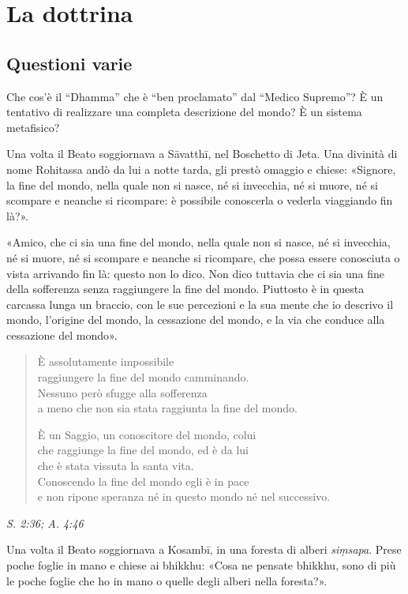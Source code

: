 \chapter{La dottrina}

\hypertarget{x-questioni-varie}{\section*{Questioni varie}}
 Che cos’è il “Dhamma” che è “ben proclamato” dal
“Medico Supremo”? È un tentativo di realizzare una completa descrizione
del mondo? È un sistema metafisico?


 Una volta il Beato soggiornava a Sāvatthī, nel Boschetto di
Jeta. Una divinità di nome Rohitassa andò da lui a notte tarda, gli
prestò omaggio e chiese: «Signore, la fine del mondo, nella quale non si
nasce, né si invecchia, né si muore, né si scompare e neanche si
ricompare: è possibile conoscerla o vederla viaggiando fin là?».


«Amico, che ci sia una fine del mondo, nella quale non si nasce, né si
invecchia, né si muore, né si scompare e neanche si ricompare, che possa
essere conosciuta o vista arrivando fin là: questo non lo dico. Non dico
tuttavia che ci sia una fine della sofferenza senza raggiungere la fine
del mondo. Piuttosto è in questa carcassa lunga un braccio, con le sue
percezioni e la sua mente che io descrivo il mondo, l’origine del mondo,
la cessazione del mondo, e la via che conduce alla cessazione del
mondo».


\begin{quote}
È assolutamente impossibile \\
raggiungere la fine del mondo camminando. \\
Nessuno però sfugge alla sofferenza \\
a meno che non sia stata raggiunta la fine del mondo.


È un Saggio, un conoscitore del mondo, colui \\
che raggiunge la fine del mondo, ed è da lui \\
che è stata vissuta la santa vita. \\
Conoscendo la fine del mondo egli è in pace \\
e non ripone speranza né in questo mondo né nel successivo.
\end{quote}

\emph{S. 2:36; A. 4:46}


Una volta il Beato soggiornava a Kosambī, in una foresta di alberi
\emph{siṃsapa}. Prese poche foglie in mano e chiese ai bhikkhu: «Cosa ne
pensate bhikkhu, sono di più le poche foglie che ho in mano o quelle
degli alberi nella foresta?».


